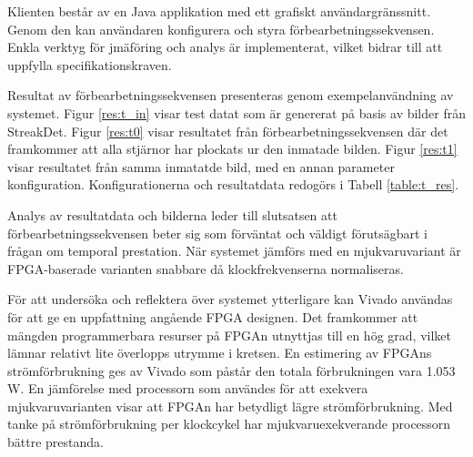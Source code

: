 \documentclass[12pt]{report}
\begin{document}
\par
Klienten består av en Java applikation med ett grafiskt användargränssnitt. 
Genom den kan användaren konfigurera och styra förbearbetningssekvensen. Enkla verktyg för jmäföring och analys är implementerat, vilket bidrar till att uppfylla specifikationskraven.
\par
Resultat av förbearbetningssekvensen presenteras genom exempelanvändning av systemet. Figur \ref{res:t_in} visar test datat som är genererat på basis av bilder från StreakDet. Figur \ref{res:t0} visar resultatet från förbearbetningssekvensen där det framkommer att alla stjärnor har plockats ur den inmatade bilden.  Figur \ref{res:t1} visar resultatet från samma inmatatde bild, med en annan parameter konfiguration. Konfigurationerna och resultatdata redogörs i Tabell \ref{table:t_res}.
\par
Analys av resultatdata och bilderna leder till slutsatsen att förbearbetningssekvensen beter sig som förväntat och väldigt förutsägbart i frågan om temporal prestation. När systemet jämförs med en mjukvaruvariant är FPGA-baserade varianten snabbare då klockfrekvenserna normaliseras.
\par
För att undersöka och reflektera över systemet ytterligare kan Vivado användas för att ge en uppfattning angående FPGA designen. Det framkommer att mängden programmerbara resurser på FPGAn utnyttjas till en hög grad, vilket lämnar relativt lite överlopps utrymme i kretsen. En estimering av FPGAns strömförbrukning ges av Vivado som påstår den totala förbrukningen vara 1.053 W. En jämförelse med processorn som användes för att exekvera mjukvaruvarianten visar att FPGAn har betydligt lägre strömförbrukning. Med tanke på strömförbrukning per klockcykel har mjukvaruexekverande processorn bättre prestanda.





\end{document}
